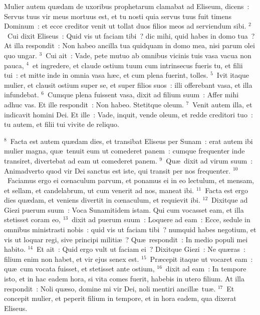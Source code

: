 \lettrine[lines=10,image=true,loversize=0.05,lraise=-0.03]{M}{}ulier autem qu\ae dam de uxoribus prophetarum clamabat ad Eliseum, dicens~: Servus tuus vir meus mortuus est, et tu nosti quia servus tuus fuit timens Dominum~: et ecce creditor venit ut tollat duos filios meos ad serviendum sibi.
${}^{2}$~Cui dixit Eliseus~: Quid vis ut faciam tibi~? dic mihi, quid habes in domo tua~? At illa respondit~: Non habeo ancilla tua quidquam in domo mea, nisi parum olei quo ungar.
${}^{3}$~Cui ait~: Vade, pete mutuo ab omnibus vicinis tuis vasa vacua non pauca,
${}^{4}$~et ingredere, et claude ostium tuum cum intrinsecus fueris tu, et filii tui~: et mitte inde in omnia vasa h\ae c, et cum plena fuerint, tolles.
${}^{5}$~Ivit itaque mulier, et clausit ostium super se, et super filios suos~: illi offerebant vasa, et illa infundebat.
${}^{6}$~Cumque plena fuissent vasa, dixit ad filium suum~: Affer mihi adhuc vas. Et ille respondit~: Non habeo. Stetitque oleum.
${}^{7}$~Venit autem illa, et indicavit homini Dei. Et ille~: Vade, inquit, vende oleum, et redde creditori tuo~: tu autem, et filii tui vivite de reliquo.


${}^{8}$~Facta est autem qu\ae dam dies, et transibat Eliseus per Sunam~: erat autem ibi mulier magna, qu\ae\ tenuit eum ut comederet panem~: cumque frequenter inde transiret, divertebat ad eam ut comederet panem.
${}^{9}$~Qu\ae\ dixit ad virum suum~: Animadverto quod vir Dei sanctus est iste, qui transit per nos frequenter.
${}^{10}$~Faciamus ergo ei cœnaculum parvum, et ponamus ei in eo lectulum, et mensam, et sellam, et candelabrum, ut cum venerit ad nos, maneat ibi.
${}^{11}$~Facta est ergo dies qu\ae dam, et veniens divertit in cœnaculum, et requievit ibi.
${}^{12}$~Dixitque ad Giezi puerum suum~: Voca Sunamitidem istam. Qui cum vocasset eam, et illa stetisset coram eo,
${}^{13}$~dixit ad puerum suum~: Loquere ad eam~: Ecce, sedule in omnibus ministrasti nobis~: quid vis ut faciam tibi~? numquid habes negotium, et vis ut loquar regi, sive principi militi\ae~? Qu\ae\ respondit~: In medio populi mei habito.
${}^{14}$~Et ait~: Quid ergo vult ut faciam ei~? Dixitque Giezi~: Ne qu\ae ras~: filium enim non habet, et vir ejus senex est.
${}^{15}$~Pr\ae cepit itaque ut vocaret eam~: qu\ae\ cum vocata fuisset, et stetisset ante ostium,
${}^{16}$~dixit ad eam~: In tempore isto, et in hac eadem hora, si vita comes fuerit, habebis in utero filium. At illa respondit~: Noli qu\ae so, domine mi vir Dei, noli mentiri ancill\ae\ tu\ae .
${}^{17}$~Et concepit mulier, et peperit filium in tempore, et in hora eadem, qua dixerat Eliseus.


